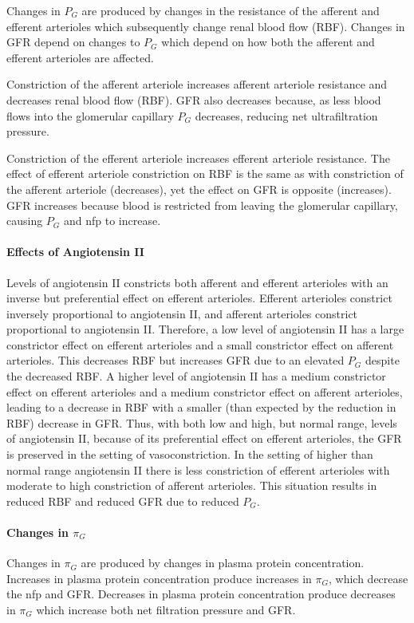 Changes in $P_{G}$ are produced by changes in the resistance of the afferent and efferent arterioles which subsequently change renal blood flow (RBF). Changes in GFR depend on changes to $P_{G}$ which depend on how both the afferent and efferent arterioles are affected.

Constriction of the afferent arteriole increases afferent arteriole resistance and decreases renal blood flow (RBF). GFR also decreases because, as less blood flows into the glomerular capillary $P_{G}$ decreases, reducing net ultrafiltration pressure.

Constriction of the efferent arteriole increases efferent arteriole resistance. The effect of efferent arteriole constriction on RBF is the same as with constriction of the afferent arteriole (decreases), yet the effect on GFR is opposite (increases). GFR increases because blood is restricted from leaving the glomerular capillary, causing $P_{G}$ and nfp to increase.

\paragraph{Effects of Angiotensin II}

Levels of angiotensin II constricts both afferent and efferent arterioles with an inverse but preferential effect on efferent arterioles. Efferent arterioles constrict inversely proportional to angiotensin II, and afferent arterioles constrict proportional to angiotensin II. Therefore, a low level of angiotensin II has a large constrictor effect on efferent arterioles and a small constrictor effect on afferent arterioles. This decreases RBF but increases GFR due to an elevated $P_G$ despite the decreased RBF. A higher level of angiotensin II has a medium constrictor effect on efferent arterioles and a medium constrictor effect on afferent arterioles, leading to a decrease in RBF with a smaller (than expected by the reduction in RBF) decrease in GFR. Thus, with both low and high, but normal range, levels of angiotensin II, because of its preferential effect on efferent arterioles, the GFR is preserved in the setting of vasoconstriction. In the setting of higher than normal range angiotensin II there is less constriction of efferent arterioles with moderate to high constriction of afferent arterioles. This situation results in reduced RBF and reduced GFR due to reduced  $P_{G}$.

\paragraph{Changes in $\pi_{G}$}
Changes in $\pi_{G}$ are produced by changes in plasma protein concentration. Increases in plasma protein concentration produce increases in $\pi_{G}$, which decrease the nfp and GFR. Decreases in plasma protein concentration produce decreases in $\pi_{G}$ which increase both net filtration pressure and GFR.

